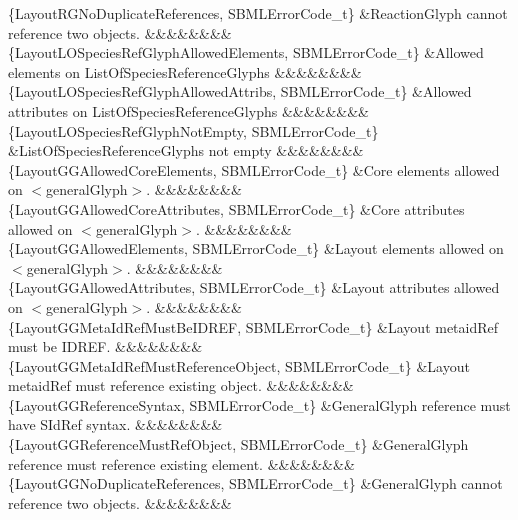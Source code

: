\begin{DoxyParagraph}{}
\begin{longtabu}
\{Layout\+R\+G\+No\+Duplicate\+References, S\+B\+M\+L\+Error\+Code\+\_\+t\} &Reaction\+Glyph cannot reference two objects. &&&&&&&&\\
\{Layout\+L\+O\+Species\+Ref\+Glyph\+Allowed\+Elements, S\+B\+M\+L\+Error\+Code\+\_\+t\} &Allowed elements on List\+Of\+Species\+Reference\+Glyphs &&&&&&&&\\
\{Layout\+L\+O\+Species\+Ref\+Glyph\+Allowed\+Attribs, S\+B\+M\+L\+Error\+Code\+\_\+t\} &Allowed attributes on List\+Of\+Species\+Reference\+Glyphs &&&&&&&&\\
\{Layout\+L\+O\+Species\+Ref\+Glyph\+Not\+Empty, S\+B\+M\+L\+Error\+Code\+\_\+t\} &List\+Of\+Species\+Reference\+Glyphs not empty &&&&&&&&\\
\{Layout\+G\+G\+Allowed\+Core\+Elements, S\+B\+M\+L\+Error\+Code\+\_\+t\} &Core elements allowed on {\ttfamily $<$general\+Glyph$>$}. &&&&&&&&\\
\{Layout\+G\+G\+Allowed\+Core\+Attributes, S\+B\+M\+L\+Error\+Code\+\_\+t\} &Core attributes allowed on {\ttfamily $<$general\+Glyph$>$}. &&&&&&&&\\
\{Layout\+G\+G\+Allowed\+Elements, S\+B\+M\+L\+Error\+Code\+\_\+t\} &Layout elements allowed on {\ttfamily $<$general\+Glyph$>$}. &&&&&&&&\\
\{Layout\+G\+G\+Allowed\+Attributes, S\+B\+M\+L\+Error\+Code\+\_\+t\} &Layout attributes allowed on {\ttfamily $<$general\+Glyph$>$}. &&&&&&&&\\
\{Layout\+G\+G\+Meta\+Id\+Ref\+Must\+Be\+I\+D\+R\+EF, S\+B\+M\+L\+Error\+Code\+\_\+t\} &Layout \textquotesingle{}metaid\+Ref\textquotesingle{} must be I\+D\+R\+EF. &&&&&&&&\\
\{Layout\+G\+G\+Meta\+Id\+Ref\+Must\+Reference\+Object, S\+B\+M\+L\+Error\+Code\+\_\+t\} &Layout \textquotesingle{}metaid\+Ref\textquotesingle{} must reference existing object. &&&&&&&&\\
\{Layout\+G\+G\+Reference\+Syntax, S\+B\+M\+L\+Error\+Code\+\_\+t\} &General\+Glyph \textquotesingle{}reference\textquotesingle{} must have S\+Id\+Ref syntax. &&&&&&&&\\
\{Layout\+G\+G\+Reference\+Must\+Ref\+Object, S\+B\+M\+L\+Error\+Code\+\_\+t\} &General\+Glyph \textquotesingle{}reference\textquotesingle{} must reference existing element. &&&&&&&&\\
\{Layout\+G\+G\+No\+Duplicate\+References, S\+B\+M\+L\+Error\+Code\+\_\+t\} &General\+Glyph cannot reference two objects. &&&&&&&&\\

\end{longtabu}
\end{DoxyParagraph}
